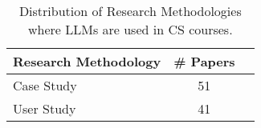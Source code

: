 \begin{table}[ht]
    \centering
    \caption{Distribution of Research Methodologies where LLMs are used in CS courses.}
    \begin{tabular}{l c p{4cm}}
        \toprule
        \textbf{Research Methodology} & \textbf{\# Papers} \\
        \midrule
		Case Study & 51 \\
		User Study & 41 \\

\end{tabular}
\end{table}
